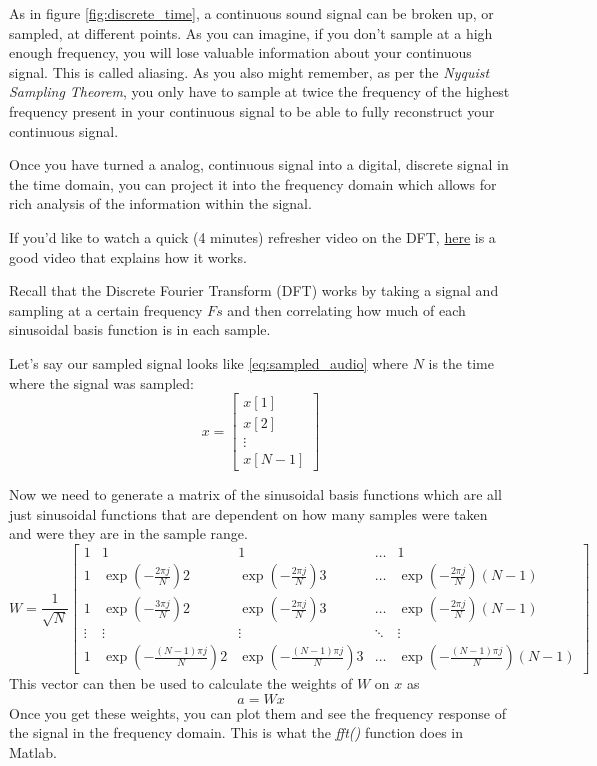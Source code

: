 \documentclass{tufte-handout}
\begin{document}
As in figure \ref{fig:discrete_time}, a continuous sound signal can be broken up, or sampled, at different points. As you can imagine, if you don't sample at a high enough frequency, you will lose valuable information about your continuous signal. This is called aliasing. As you also might remember, as per the \textit{Nyquist Sampling Theorem}, you only have to sample at twice the frequency of the highest frequency present in your continuous signal to be able to fully reconstruct your continuous signal. 

Once you have turned a analog, continuous signal into a digital, discrete signal in the time domain, you can project it into the frequency domain which allows for rich analysis of the information within the signal. 

If you'd like to watch a quick (4 minutes) refresher video on the DFT, \href{https://www.youtube.com/watch?v=h6QJLx22zrE}{here} is a good video that explains how it works.

Recall that the Discrete Fourier Transform (DFT) works by taking a signal and sampling at a certain frequency $Fs$ and then correlating how much of each sinusoidal basis function is in each sample. 

Let's say our sampled signal looks like \ref{eq:sampled_audio} where $N$ is the time where the signal was sampled:
\begin{equation}\label{eq:sampled_audio}
    x=
\begin{bmatrix}
    x[1]       \\
    x[2]       \\
    \vdots \\
    x[N-1]
\end{bmatrix}
\end{equation}

Now we need to generate a matrix of the sinusoidal basis functions which are all just sinusoidal functions that are dependent on how many samples were taken and were they are in the sample range.
\begin{equation}\label{eq:basis_fns}
    W=\dfrac{1}{\sqrt{N}}
\begin{bmatrix}
    1 & 1 & 1 & \dots  & 1 \\
    1 & \exp(-\frac{2 \pi j}{N})2 & \exp(-\frac{2 \pi j}{N})3 & \dots  & \exp(-\frac{2 \pi j}{N})(N-1) \\
    1 & \exp(-\frac{3 \pi j}{N})2 & \exp(-\frac{2 \pi j}{N})3 & \dots  & \exp(-\frac{2 \pi j}{N}) (N-1) \\
    \vdots & \vdots & \vdots & \ddots & \vdots \\
    1 & \exp(-\frac{(N-1) \pi j}{N})2 & \exp(-\frac{(N-1) \pi j}{N})3 & \dots  & \exp(-\frac{(N-1) \pi j}{N}) (N-1)
\end{bmatrix}
\end{equation}
This vector can then be used to calculate the weights of $W$ on $x$ as
\begin{equation}
a = W x
\end{equation}
Once you get these weights, you can plot them and see the frequency response of the signal in the frequency domain. This is what the \textit{fft()} function does in Matlab.
\end{document}
